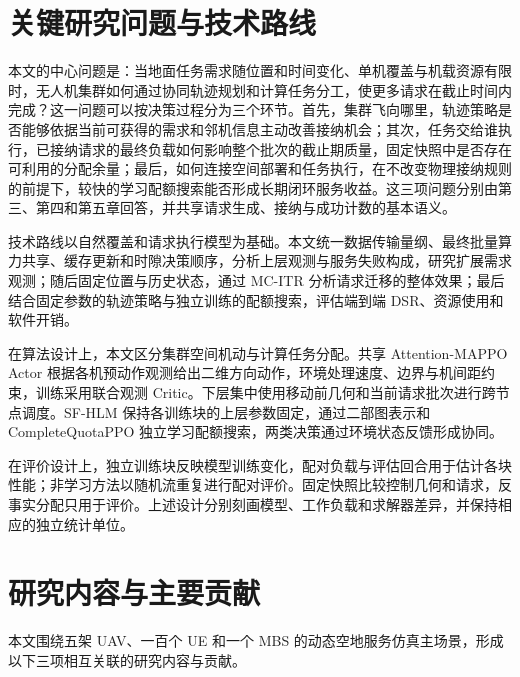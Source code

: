 

\section{关键研究问题与技术路线}
\label{sec:ch1-questions}

本文的中心问题是：当地面任务需求随位置和时间变化、单机覆盖与机载资源有限时，无人机集群如何通过协同轨迹规划和计算任务分工，使更多请求在截止时间内完成？这一问题可以按决策过程分为三个环节。首先，集群飞向哪里，轨迹策略是否能够依据当前可获得的需求和邻机信息主动改善接纳机会；其次，任务交给谁执行，已接纳请求的最终负载如何影响整个批次的截止期质量，固定快照中是否存在可利用的分配余量；最后，如何连接空间部署和任务执行，在不改变物理接纳规则的前提下，较快的学习配额搜索能否形成长期闭环服务收益。这三项问题分别由第三、第四和第五章回答，并共享请求生成、接纳与成功计数的基本语义。

技术路线以自然覆盖和请求执行模型为基础。本文统一数据传输量纲、最终批量算力共享、缓存更新和时隙决策顺序，分析上层观测与服务失败构成，研究扩展需求观测；随后固定位置与历史状态，通过 MC-ITR 分析请求迁移的整体效果；最后结合固定参数的轨迹策略与独立训练的配额搜索，评估端到端 DSR、资源使用和软件开销。

在算法设计上，本文区分集群空间机动与计算任务分配。共享 Attention-MAPPO Actor 根据各机预动作观测给出二维方向动作，环境处理速度、边界与机间距约束，训练采用联合观测 Critic。下层集中使用移动前几何和当前请求批次进行跨节点调度。SF-HLM 保持各训练块的上层参数固定，通过二部图表示和 CompleteQuotaPPO 独立学习配额搜索，两类决策通过环境状态反馈形成协同。

在评价设计上，独立训练块反映模型训练变化，配对负载与评估回合用于估计各块性能；非学习方法以随机流重复进行配对评价。固定快照比较控制几何和请求，反事实分配只用于评价。上述设计分别刻画模型、工作负载和求解器差异，并保持相应的独立统计单位。

\section{研究内容与主要贡献}
\label{sec:contributions}

本文围绕五架 UAV、一百个 UE 和一个 MBS 的动态空地服务仿真主场景，形成以下三项相互关联的研究内容与贡献。

